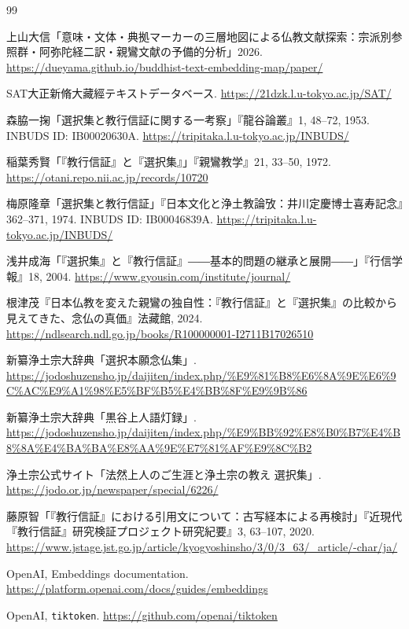 \documentclass[uplatex,dvipdfmx,11pt,a4paper]{jsarticle}
\begin{document}
\begin{thebibliography}{99}

上山大信「意味・文体・典拠マーカーの三層地図による仏教文献探索：宗派別参照群・阿弥陀経二訳・親鸞文献の予備的分析」2026.
\url{https://dueyama.github.io/buddhist-text-embedding-map/paper/}

SAT大正新脩大藏經テキストデータベース.
\url{https://21dzk.l.u-tokyo.ac.jp/SAT/}

森脇一掬「選択集と教行信証に関する一考察」『龍谷論叢』1, 48--72, 1953.
INBUDS ID: IB00020630A.
\url{https://tripitaka.l.u-tokyo.ac.jp/INBUDS/}

稲葉秀賢「『教行信証』と『選択集』」『親鸞教学』21, 33--50, 1972.
\url{https://otani.repo.nii.ac.jp/records/10720}

梅原隆章「選択集と教行信証」『日本文化と浄土教論攷：井川定慶博士喜寿記念』362--371, 1974.
INBUDS ID: IB00046839A.
\url{https://tripitaka.l.u-tokyo.ac.jp/INBUDS/}

浅井成海「『選択集』と『教行信証』――基本的問題の継承と展開――」『行信学報』18, 2004.
\url{https://www.gyousin.com/institute/journal/}

根津茂『日本仏教を変えた親鸞の独自性：『教行信証』と『選択集』の比較から見えてきた、念仏の真価』法藏館, 2024.
\url{https://ndlsearch.ndl.go.jp/books/R100000001-I2711B17026510}

新纂浄土宗大辞典「選択本願念仏集」.
\url{https://jodoshuzensho.jp/daijiten/index.php/%E9%81%B8%E6%8A%9E%E6%9C%AC%E9%A1%98%E5%BF%B5%E4%BB%8F%E9%9B%86}

新纂浄土宗大辞典「黒谷上人語灯録」.
\url{https://jodoshuzensho.jp/daijiten/index.php/%E9%BB%92%E8%B0%B7%E4%B8%8A%E4%BA%BA%E8%AA%9E%E7%81%AF%E9%8C%B2}

浄土宗公式サイト「法然上人のご生涯と浄土宗の教え 選択集」.
\url{https://jodo.or.jp/newspaper/special/6226/}

藤原智「『教行信証』における引用文について：古写経本による再検討」『近現代『教行信証』研究検証プロジェクト研究紀要』3, 63--107, 2020.
\url{https://www.jstage.jst.go.jp/article/kyogyoshinsho/3/0/3_63/_article/-char/ja/}

OpenAI, Embeddings documentation.
\url{https://platform.openai.com/docs/guides/embeddings}

OpenAI, \texttt{tiktoken}.
\url{https://github.com/openai/tiktoken}

\end{thebibliography}
\end{document}
